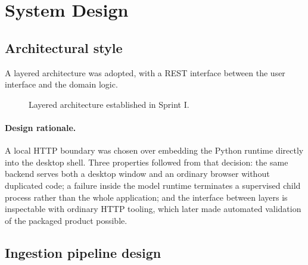 \documentclass[11pt,a4paper]{article}
\begin{document}
\section{System Design}

\subsection{Architectural style}

A layered architecture was adopted, with a REST interface between the user
interface and the domain logic.

\begin{figure}[H]
\centering
{}
\caption{Layered architecture established in Sprint I.}
\end{figure}

\paragraph{Design rationale.} A local HTTP boundary was chosen over embedding
the Python runtime directly into the desktop shell. Three properties followed
from that decision: the same backend serves both a desktop window and an
ordinary browser without duplicated code; a failure inside the model runtime
terminates a supervised child process rather than the whole application; and the
interface between layers is inspectable with ordinary HTTP tooling, which later
made automated validation of the packaged product possible.

\subsection{Ingestion pipeline design}
\end{document}
